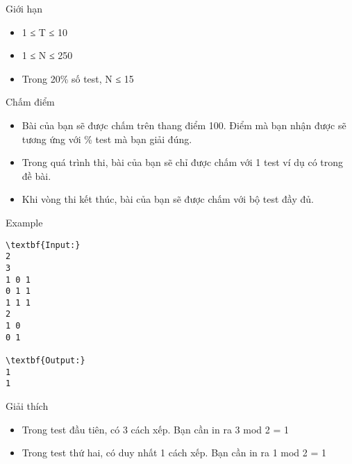 Giới hạn
\begin{itemize}
	\item     1 ≤ T ≤ 10   
	\item     1 ≤ N ≤ 250   
	\item     Trong 20\% số test, N ≤ 15   
\end{itemize}
Chấm điểm
\begin{itemize}
	\item     Bài của bạn sẽ được chấm trên thang điểm 100. Điểm mà bạn nhận được sẽ tương ứng với \% test mà bạn giải đúng.   
	\item     Trong quá trình thi, bài của bạn sẽ chỉ được chấm với 1 test ví dụ có trong đề bài.   
	\item     Khi vòng thi kết thúc, bài của bạn sẽ được chấm với bộ test đầy đủ.   
\end{itemize}
\begin{itemize}
\end{itemize}
Example
\begin{verbatim}
\textbf{Input:}
2
3
1 0 1
0 1 1
1 1 1
2
1 0
0 1

\textbf{Output:}
1
1
\end{verbatim}
Giải thích
\begin{itemize}
	\item     Trong test đầu tiên, có 3 cách xếp. Bạn cần in ra 3 mod 2 = 1   
	\item     Trong test thứ hai, có duy nhất 1 cách xếp. Bạn cần in ra 1 mod 2 = 1   
\end{itemize}